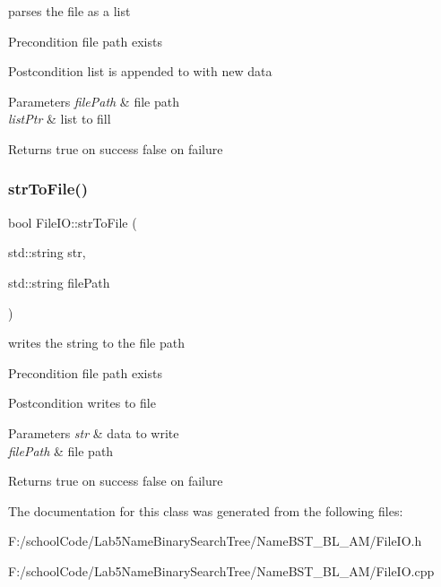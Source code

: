 parses the file as a list \begin{DoxyPrecond}{Precondition}
file path exists 
\end{DoxyPrecond}
\begin{DoxyPostcond}{Postcondition}
list is appended to with new data 
\end{DoxyPostcond}

\begin{DoxyParams}{Parameters}
{\em file\+Path} & file path \\
\hline
{\em list\+Ptr} & list to fill \\
\hline
\end{DoxyParams}
\begin{DoxyReturn}{Returns}
true on success false on failure 
\end{DoxyReturn}
\mbox{\label{class_file_i_o_ac3a2546c33e52aab6f4b9376d5c41d5e}} 
\subsubsection{\texorpdfstring{str\+To\+File()}{strToFile()}}
{\footnotesize\ttfamily bool File\+I\+O\+::str\+To\+File (\begin{DoxyParamCaption}\item[{std\+::string}]{str,  }\item[{std\+::string}]{file\+Path }\end{DoxyParamCaption})\hspace{0.3cm}{\ttfamily [static]}}

writes the string to the file path \begin{DoxyPrecond}{Precondition}
file path exists 
\end{DoxyPrecond}
\begin{DoxyPostcond}{Postcondition}
writes to file 
\end{DoxyPostcond}

\begin{DoxyParams}{Parameters}
{\em str} & data to write \\
\hline
{\em file\+Path} & file path \\
\hline
\end{DoxyParams}
\begin{DoxyReturn}{Returns}
true on success false on failure 
\end{DoxyReturn}


The documentation for this class was generated from the following files\+:\begin{DoxyCompactItemize}
\item 
F\+:/school\+Code/\+Lab5\+Name\+Binary\+Search\+Tree/\+Name\+B\+S\+T\+\_\+\+B\+L\+\_\+\+A\+M/File\+I\+O.\+h\item 
F\+:/school\+Code/\+Lab5\+Name\+Binary\+Search\+Tree/\+Name\+B\+S\+T\+\_\+\+B\+L\+\_\+\+A\+M/File\+I\+O.\+cpp\end{DoxyCompactItemize}
